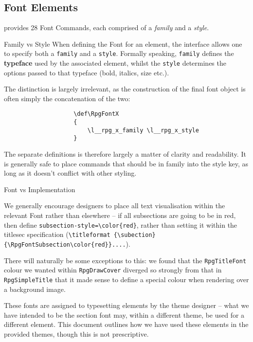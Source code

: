 		\subsection{Font Elements}
			\rpgtex{} provides 28 Font Commands, each comprised of a \textit{family} and a \textit{style}. 
			\begin{RpgSidebar}{Family vs Style}
				When defining the Font for an element, the interface allows one to specify both a \texttt{family} and a \texttt{style}. Formally speaking, \texttt{family} defines the \textbf{typeface} used by the associated element, whilst the \texttt{style} determines the options passed to that typeface (bold, italics, size etc.).

				The distinction is largely irrelevant, as the construction of the final font object is often simply the concatenation of the two:
				\begin{lstlisting}
					\def\RpgFontX
					{
						\l__rpg_x_family \l__rpg_x_style
					}
				\end{lstlisting}
				The separate definitions is therefore largely a matter of clarity and readability. It is generally safe to place commands that should be in family into the style key, as long as it doesn't conflict with other styling.
				
				\vspace{1em}
				{\RpgFontSidebarTitle \noindent Font vs Implementation}

				We generally encourage designers to place all text visualisation within the relevant Font rather than elsewhere -- if all subsections are going to be in red, then define \verb|subsection-style=\color{red}|, rather than setting it within the titlesec specification (\verb|\titleformat {\subection}{\RpgFontSubsection\color{red}}....|).

				There will naturally be some exceptions to this: we found that the \verb|RpgTitleFont| colour we wanted within \verb|RpgDrawCover| diverged so strongly from that in \verb|RpgSimpleTitle| that it made sense to define a special colour when rendering over a background image.
			\end{RpgSidebar}

			These fonts are assigned to typesetting elements by the theme designer -- what we have intended to be the section font may, within a different theme, be used for a different element. This document outlines how we have used these elements in the provided themes, though this is not prescriptive.
			
